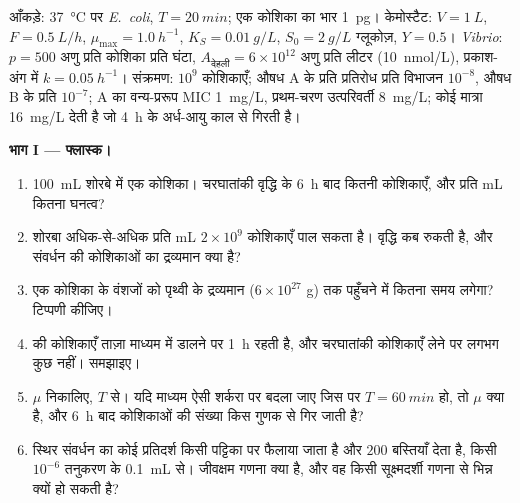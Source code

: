 \begin{problem}
\label{pb:b3:bacteriology:1}
आँकड़े: \qty{37}{\celsius} पर \emph{E.~coli}, $T = \qty{20}{min}$; एक
कोशिका का भार \qty{1}{pg}। केमोस्टैट: $V = \qty{1}{L}$, $F = \qty{0.5}{L/h}$,
$\mu_{\max} = \qty{1.0}{h^{-1}}$, $K_{S} = \qty{0.01}{g/L}$, $S_{0} =
\qty{2}{g/L}$ ग्लूकोज़, $Y = 0.5$। \emph{Vibrio}: $p = 500$ 
अणु प्रति कोशिका प्रति घंटा, $A_{\text{देहली}} = 6\times 10^{12}$
अणु प्रति लीटर (\qty{10}{nmol/L}), प्रकाश-अंग में $k = \qty{0.05}{h^{-1}}$।
संक्रमण: $10^{9}$ कोशिकाएँ; औषध A के प्रति प्रतिरोध
प्रति विभाजन $10^{-8}$, औषध B के प्रति $10^{-7}$; A का वन्य-प्ररूप MIC
\qty{1}{mg/L}, प्रथम-चरण उत्परिवर्ती \qty{8}{mg/L}; कोई मात्रा
\qty{16}{mg/L} देती है जो \qty{4}{h} के अर्ध-आयु काल से गिरती है।

\medskip
\noindent\textbf{भाग I --- फ्लास्क।}
\begin{enumerate}
  \item \qty{100}{mL} शोरबे में एक कोशिका। चरघातांकी वृद्धि के
        \qty{6}{h} बाद कितनी कोशिकाएँ, और प्रति mL कितना घनत्व?
  \item शोरबा अधिक-से-अधिक प्रति mL $2\times 10^{9}$ कोशिकाएँ पाल सकता
        है। वृद्धि कब रुकती है, और संवर्धन की कोशिकाओं का द्रव्यमान
        क्या है?
  \item एक कोशिका के वंशजों को पृथ्वी के द्रव्यमान ($6\times 10^{27}$ g)
        तक पहुँचने में कितना समय लगेगा? टिप्पणी कीजिए।
  \item {} की कोशिकाएँ ताज़ा माध्यम में डालने पर  \qty{1}{h} रहती है, और चरघातांकी कोशिकाएँ लेने पर
        लगभग कुछ नहीं। समझाइए।
  \item $\mu$ निकालिए, $T$ से। यदि माध्यम ऐसी शर्करा पर बदला जाए जिस पर
        $T = \qty{60}{min}$ हो, तो $\mu$ क्या है, और \qty{6}{h} बाद
        कोशिकाओं की संख्या किस गुणक से गिर जाती है?
  \item स्थिर संवर्धन का कोई प्रतिदर्श किसी पट्टिका पर फैलाया जाता है
        और $200$ बस्तियाँ देता है, किसी $10^{-6}$ तनुकरण के
        \qty{0.1}{mL} से।
        जीवक्षम गणना क्या है, और वह किसी सूक्ष्मदर्शी गणना से भिन्न
        क्यों हो सकती है?
\end{enumerate}


\end{problem}
